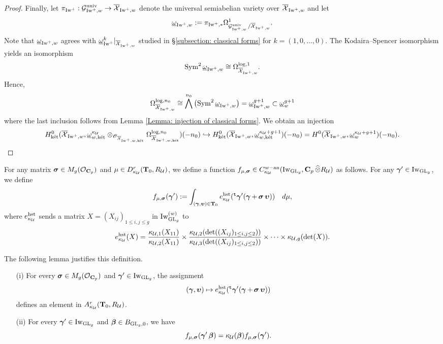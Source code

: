 \begin{proof}
Finally, let $\pi_{\Iw^+}:\calG_{\Iw^+, w}^{\univ}\rightarrow \overline{\calX}_{\Iw^+, w}$ denote the universal semiabelian variety over $\overline{\calX}_{\Iw^+, w}$ and let $$\underline{\omega}_{\Iw^+, w}:=\pi_{\Iw^+, *}\Omega^1_{\calG_{\Iw^+, w}^{\univ}/\overline{\calX}_{\Iw^+ ,w}}.$$ 
Note that $\underline{\omega}_{\Iw^+, w}$ agrees with $\underline{\omega}^k_{\Iw^+}|_{\overline{\calX}_{\Iw^+ ,w}}$ studied in \S \ref{subsection: classical forms} for $k=(1,0,\ldots, 0)$. The Kodaira--Spencer isomorphism \cite[Theorem 1.41 (4)]{LanKS} yields an isomorphism $$\Sym^2\underline{\omega}_{\Iw^+, w}\cong \Omega_{\overline{\calX}_{\Iw^+, w}}^{\log, 1}.$$ 
Hence, 
$$\Omega_{\overline{\calX}_{\Iw^+, w}}^{\log, n_0}\cong \bigwedge^{n_0}\left(\Sym^2\underline{\omega}_{\Iw^+, w}\right)=\underline{\omega}_{\Iw^+, w}^{g+1}\subset \underline{\omega}_w^{g+1}$$
where the last inclusion follows from Lemma \ref{Lemma: injection of classical forms}. We obtain an injection $$
H^{0}_{\ket}(\overline{\calX}_{\Iw^+, w}, \underline{\omega}_{w, \ket}^{\kappa_{\calU}}\otimes_{\scrO_{\overline{\calX}_{\Iw^+, w,\ket}}} \Omega^{\log, n_0}_{\overline{\calX}_{\Iw^+, w, \ket}})(-n_0) \hookrightarrow H_{\ket}^0(\overline{\calX}_{\Iw^+, w}, \underline{\omega}_{w,\ket}^{\kappa_{\calU}+g+1})(-n_0)=H^0(\overline{\calX}_{\Iw^+, w}, \underline{\omega}_w^{\kappa_{\calU}+g+1})(-n_0).$$
\end{proof}

For any matrix $\bfsigma\in M_g(\calO_{\C_p})$ and $\mu\in D_{\kappa_{\calU}}^{r}(\T_0, R_{\calU})$, we define a function $f_{\mu, \bfsigma}\in C_{\kappa_{\calU}}^{w-\an}(\Iw_{\GL_g}, \C_p\widehat{\otimes}R_{\calU})$ as follows. For any $\bfgamma'\in \Iw_{\GL_g}$, we define
$$f_{\mu, \bfsigma}(\bfgamma'):= \int_{(\bfgamma, \bfupsilon)\in \T_0}e_{\kappa_{\calU}}^{\hst}(\trans\bfgamma'(\bfgamma+\bfsigma\bfupsilon))\quad d\mu,$$ where $e_{\kappa_{\calU}}^{\hst}$ sends a matrix $X=(X_{ij})_{1\leq i,j\leq g}$ in $\Iw^{(w)}_{\GL_g}$ to 
$$    e_{\kappa_{\calU}}^{\hst}(X)=\frac{\kappa_{\calU, 1}(X_{11})}{\kappa_{\calU, 2}(X_{11})}\times \frac{\kappa_{\calU, 2}(\det((X_{ij})_{1\leq i,j\leq 2}))}{\kappa_{\calU, 3}(\det((X_{ij})_{1\leq i,j\leq 2}))}\times \cdots \times \kappa_{\calU, g}(\det(X)).
$$

The following lemma justifies this definition.
\begin{Lemma}
\begin{enumerate}
    \item[(i)] For every $\bfsigma\in M_g(\calO_{\C_p})$ and $\bfgamma'\in \Iw_{\GL_g}$, the assignment $$(\bfgamma, \bfupsilon)\mapsto e_{\kappa_{\calU}}^{\hst}(\trans\bfgamma'(\bfgamma+\bfsigma\bfupsilon))$$ defines an element in $A^r_{\kappa_{\calU}}(\T_0, R_{\calU})$.
    \item[(ii)] For every $\bfgamma'\in \Iw_{\GL_g}$ and $\bfbeta\in B_{\GL_g, 0}$, we have $$f_{\mu, \bfsigma}(\bfgamma'\bfbeta)=\kappa_{\calU}(\bfbeta)f_{\mu, \bfsigma}(\bfgamma').$$
\end{enumerate} 
\end{Lemma}

